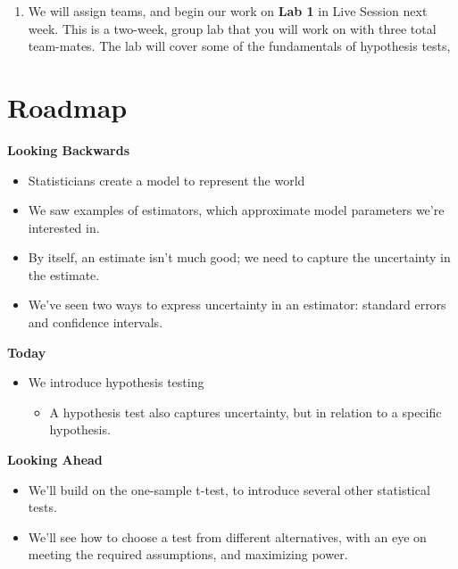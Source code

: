 \documentclass[
]{book}
\providecommand{\tightlist}{%
  \setlength{\itemsep}{0pt}\setlength{\parskip}{0pt}}
\theoremstyle{definition}
\theoremstyle{definition}
\theoremstyle{definition}
\theoremstyle{definition}
\theoremstyle{remark}
\begin{document}
\begin{enumerate}
\def\labelenumi{\arabic{enumi}.}
\setcounter{enumi}{2}
\tightlist
\item
  We will assign teams, and begin our work on \textbf{Lab 1} in Live Session next week. This is a two-week, group lab that you will work on with three total team-mates. The lab will cover some of the fundamentals of hypothesis tests,
\end{enumerate}

\hypertarget{roadmap-2}{%
\section{Roadmap}\label{roadmap-2}}

\textbf{Looking Backwards}

\begin{itemize}
\tightlist
\item
  Statisticians create a model to represent the world
\item
  We saw examples of estimators, which approximate model parameters we're interested in.
\item
  By itself, an estimate isn't much good; we need to capture the uncertainty in the estimate.
\item
  We've seen two ways to express uncertainty in an estimator: standard errors and confidence intervals.
\end{itemize}

\textbf{Today}

\begin{itemize}
\tightlist
\item
  We introduce hypothesis testing

  \begin{itemize}
  \tightlist
  \item
    A hypothesis test also captures uncertainty, but in relation to a specific hypothesis.
  \end{itemize}
\end{itemize}

\textbf{Looking Ahead}

\begin{itemize}
\tightlist
\item
  We'll build on the one-sample t-test, to introduce several other statistical tests.
\item
  We'll see how to choose a test from different alternatives, with an eye on meeting the required assumptions, and maximizing power.
\end{itemize}
\end{document}

